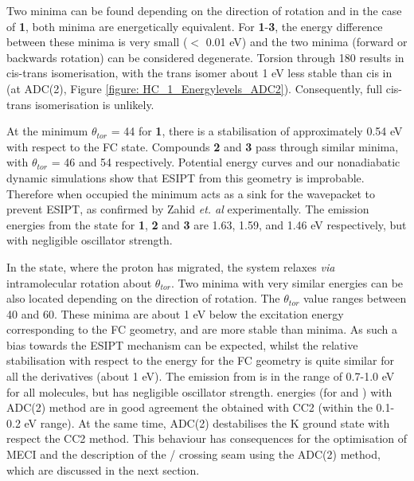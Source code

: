 Two \Estar{} minima can be found depending on the direction of rotation and in the case of \textbf{1}, both minima are energetically equivalent. For \textbf{1}-\textbf{3}, the energy difference between these minima is very small ($<$ 0.01 eV) and the two minima (forward or backwards rotation) can be considered degenerate. Torsion through 180\textdegree{} results in cis-trans isomerisation, with the trans isomer about 1 eV less stable than cis in \sone (at ADC(2), Figure \ref{figure: HC_1_Energylevels_ADC2}). Consequently, full cis-trans isomerisation is unlikely. 

At the \Estar{} minimum  $\theta_{tor}$ = 44\textdegree{} for \textbf{1}, there is a stabilisation of approximately 0.54 eV with respect to the FC state. Compounds \textbf{2} and \textbf{3} pass through similar minima, with $\theta_{tor}$ = 46\textdegree{} and 54\textdegree{} respectively. Potential energy curves and our nonadiabatic dynamic simulations show that ESIPT from this geometry is improbable. Therefore when occupied the \Estar{} minimum acts as a sink for the wavepacket to prevent \ac{ESIPT}, as confirmed by Zahid \textit{et. al} experimentally.\cite{Zahid2017} The emission energies from the \Estar{} state for \textbf{1}, \textbf{2} and \textbf{3} are 1.63, 1.59, and 1.46 eV respectively, but with negligible oscillator strength.

In the \Kstar{} state, where the proton has migrated, the system relaxes \textit{via} intramolecular rotation about $\theta_{tor}$. Two minima with very similar energies can be also located depending on the direction of rotation. The $\theta_{tor}$ value ranges between 40\textdegree{} and 60\textdegree{}. These minima are about 1 eV below the excitation energy corresponding to the FC geometry, and are more stable than \Estar{} minima. As such a bias towards the ESIPT mechanism can be expected, whilst the relative stabilisation with respect to the \sone{} energy for the FC geometry is quite similar for all the derivatives (about 1 eV). The emission from \Kstar{} is in the range of 0.7-1.0 eV for all molecules, but has negligible oscillator strength. \sone{} energies (for \Kstar{} and \Estar) with ADC(2) method are in good agreement the obtained with CC2 (within the 0.1-0.2 eV range). At the same time, ADC(2) destabilises the K ground state with respect the CC2 method. This behaviour has consequences for the optimisation of MECI and the description of the \sone/\szero{} crossing seam using the ADC(2) method, which are discussed in the next section.

